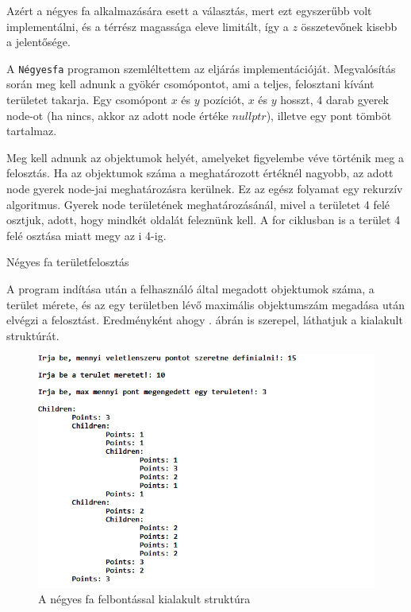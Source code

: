 Azért a négyes fa alkalmazására esett a választás, mert ezt egyszerűbb volt implementálni, és a térrész magassága eleve limitált, így a $z$ összetevőnek kisebb a jelentősége.


A \texttt{Négyesfa} programon szemléltettem az eljárás implementációját. Megvalósítás során meg kell adnunk a gyökér csomópontot, ami a teljes, felosztani kívánt területet takarja. Egy csomópont $x$ és $y$ pozíciót, $x$ és $y$ hosszt, 4 darab gyerek node-ot (ha nincs, akkor az adott node értéke $nullptr$), illetve egy pont tömböt tartalmaz.

Meg kell adnunk az objektumok helyét, amelyeket figyelembe véve történik meg a felosztás. Ha az objektumok száma a meghatározott értéknél nagyobb, az adott node gyerek node-jai meghatározásra kerülnek. Ez az egész folyamat egy rekurzív algoritmus. Gyerek node területének meghatározásánál, mivel a területet 4 felé osztjuk, adott, hogy mindkét oldalát feleznünk kell. A for ciklusban is a terület 4 felé osztása miatt megy az i 4-ig. 

\begin{algorithm}[H]
 \caption{Négyes fa területfelosztás}
\end{algorithm}

\newpage

A program indítása után a felhasználó által megadott objektumok száma, a terület mérete, és az egy területben lévő maximális objektumszám megadása után elvégzi a felosztást. Eredményként ahogy . ábrán is szerepel, láthatjuk a kialakult struktúrát.

\begin{figure}[h]
\centering
\includegraphics[scale=0.65]{kepek/quadtree_demo.png}
\caption{A négyes fa felbontással kialakult struktúra}
\label{fig:quad_demo}
\end{figure}
